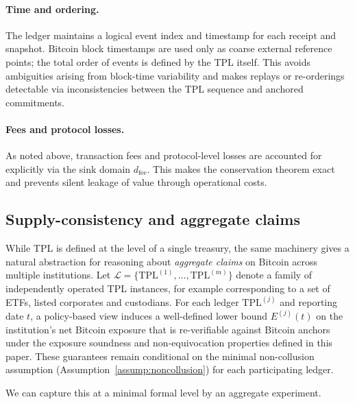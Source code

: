 \documentclass[11pt]{article}
\begin{document}
\paragraph{Time and ordering.}
The ledger maintains a logical event index and timestamp for each receipt and snapshot.
Bitcoin block timestamps are used only as coarse external reference points; the total order of events is defined by the TPL itself.
This avoids ambiguities arising from block-time variability and makes replays or re-orderings detectable via inconsistencies between the TPL sequence and anchored commitments.

\paragraph{Fees and protocol losses.}
As noted above, transaction fees and protocol-level losses are accounted for explicitly via the sink domain $d_{\mathrm{fee}}$.
This makes the conservation theorem exact and prevents silent leakage of value through operational costs.

\subsection{Supply-consistency and aggregate claims}

While TPL is defined at the level of a single treasury, the same machinery gives a natural abstraction for
reasoning about \emph{aggregate claims} on Bitcoin across multiple institutions.
Let $\mathcal{L} = \{\mathrm{TPL}^{(1)},\dots,\mathrm{TPL}^{(m)}\}$ denote a family of independently operated
TPL instances, for example corresponding to a set of ETFs, listed corporates and custodians.
For each ledger $\mathrm{TPL}^{(j)}$ and reporting date $t$, a policy-based view induces a well-defined
lower bound $E^{(j)}(t)$ on the institution's net Bitcoin exposure that is re-verifiable against Bitcoin
anchors under the exposure soundness and non-equivocation properties defined in this paper. These guarantees remain conditional on the minimal non-collusion assumption (Assumption~\ref{assump:noncollusion}) for each participating ledger.

We can capture this at a minimal formal level by an aggregate experiment.
\end{document}
